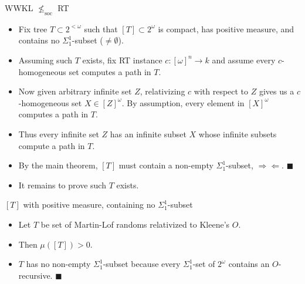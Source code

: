 \begin{frame}{WWKL $\nleq_{\text{soc}}$ RT}
  \begin{itemize}
    \item Fix tree $T\subset 2^{<\omega}$ such that
      $[T]\subset 2^\omega$ is compact, has positive measure, and
      contains no $\Sigma_1^1$-subset ($\neq\emptyset$).
    \item Assuming such $T$ exists, fix RT instance
      $c:[\omega]^n\rightarrow k$ and assume every $c$-homogeneous set
      computes a path in $T$.
    \item Now given arbitrary infinite set $Z$, relativizing $c$ with
      respect to $Z$ gives us a $c$-homogeneous set $X\in[Z]^\omega$.
      By assumption, every element in $[X]^\omega$ computes a path in $T$.
    \item Thus every infinite set $Z$ has an infinite subset $X$ whose
      infinite subsets compute a path in $T$.
    \item By the main theorem, $[T]$ must contain a
      non-empty $\Sigma_1^1$-subset, $\Rightarrow\Leftarrow$.
      $\blacksquare$
    \item It remains to prove such $T$ exists.
  \end{itemize}
\end{frame}

\begin{frame}{$[T]$ with positive measure, containing no
$\Sigma_1^1$-subset}
  \begin{itemize}
    \item Let $T$ be set of Martin-Lof randoms relativized to Kleene's $O$.
    \item Then $\mu([T])>0$.
    \item $T$ has no non-empty $\Sigma_1^1$-subset because every
      $\Sigma_1^1$-set of $2^\omega$ contains an $O$-recursive.
      $\blacksquare$
  \end{itemize}
\end{frame}
